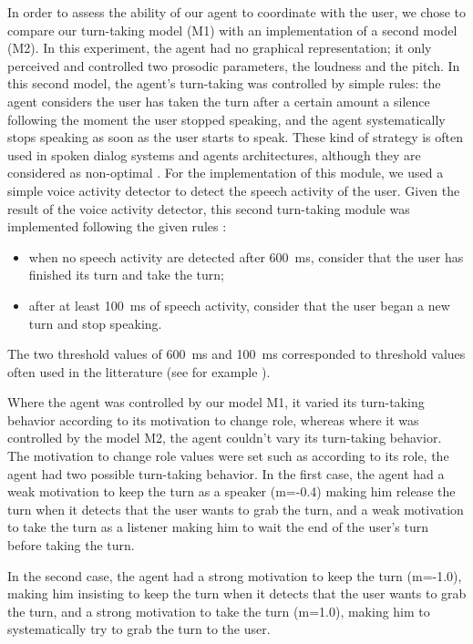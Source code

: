 In order to assess the ability of our agent to coordinate with the user, we chose to compare our turn-taking model (M1) with an implementation of a second model (M2). In this experiment, the agent had no graphical representation; it only perceived and controlled two prosodic parameters, the loudness and the pitch. 
In this second model, the agent's turn-taking was controlled by simple rules: the agent considers the user has taken the turn after a certain amount a silence following the moment the user stopped speaking, and the agent systematically stops speaking as soon as the user starts to speak. 
These kind of strategy is often used in spoken dialog systems and agents architectures, although they are considered as non-optimal \citep{ward_root_2005}. 
For the implementation of this module, we used a simple voice activity detector to detect the speech activity of the user. Given the result of the voice activity detector, this second turn-taking module was implemented following the given rules : \begin{itemize}
	\item when no speech activity are detected after 600~ms, consider that the user has finished its turn and take the turn;
	\item after at least 100~ms of speech activity, consider that the user began a new turn and stop speaking. 
\end{itemize} 
The two threshold values of 600~ms and 100~ms corresponded to threshold values often used in the litterature (see for example \citep{ferrer_is_2002}). 

Where the agent was controlled by our model M1, it varied its turn-taking behavior according to its motivation to change role, whereas where it was controlled by the model M2, the agent couldn't vary its turn-taking behavior. The motivation to change role values were set such as according to its role, the agent had two possible turn-taking behavior. In the first case, the agent had a weak motivation to keep the turn as a speaker (m=-0.4) making him release the turn when it detects that the user wants to grab the turn, and a weak motivation to take the turn as a listener making him to wait the end of the user's turn before taking the turn.

In the second case, the agent had a strong motivation to keep the turn (m=-1.0), making him insisting to keep the turn when it detects that the user wants to grab the turn, and a strong motivation to take the turn (m=1.0), making him to systematically try to grab the turn to the user. 

